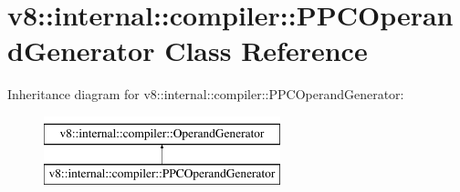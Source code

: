 \hypertarget{classv8_1_1internal_1_1compiler_1_1PPCOperandGenerator}{}\section{v8\+:\+:internal\+:\+:compiler\+:\+:P\+P\+C\+Operand\+Generator Class Reference}
\label{classv8_1_1internal_1_1compiler_1_1PPCOperandGenerator}
Inheritance diagram for v8\+:\+:internal\+:\+:compiler\+:\+:P\+P\+C\+Operand\+Generator\+:\begin{figure}[H]
\begin{center}
\leavevmode
\includegraphics[height=2.000000cm]{classv8_1_1internal_1_1compiler_1_1PPCOperandGenerator}
\end{center}
\end{figure}
